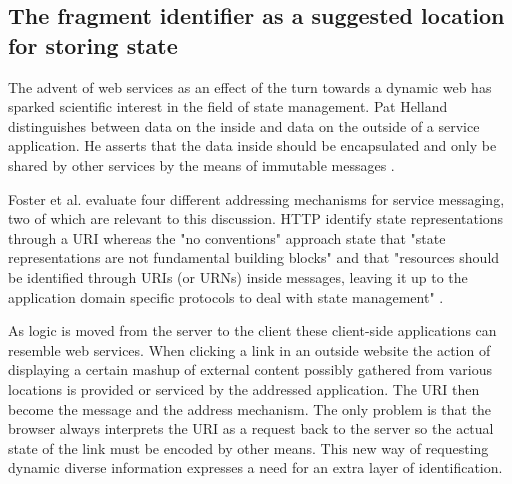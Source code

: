 \documentclass[english]{ifimaster}
\begin{document}





\subsection{The fragment identifier as a suggested location for storing state}
\label{sec:storingState}
The advent of web services as an effect of the turn towards a dynamic web has sparked scientific interest in the field of state management. Pat Helland distinguishes between data on the inside and data on the outside of a service application. He asserts that the data inside should be encapsulated and only be shared by other services by the means of immutable messages \parencite{helland2005data}. 

Foster et al. evaluate four different addressing mechanisms for service messaging, two of which are relevant to this discussion. HTTP identify state representations through a URI whereas the "no conventions" approach state that "state representations are not fundamental building blocks" and that "resources should be identified through URIs (or URNs) inside messages, leaving it up to the application domain specific protocols to deal with state management" \parencite{foster}.

As logic is moved from the server to the client these client-side applications can resemble web services. When clicking a link in an outside website the action of displaying a certain mashup of external content possibly gathered from various locations is provided or serviced by the addressed application. The URI then become the message and the address mechanism. The only problem is that the browser always interprets the URI as a request back to the server so the actual state of the link must be encoded by other means. This new way of requesting dynamic diverse information expresses a need for an extra layer of identification.





\end{document}

